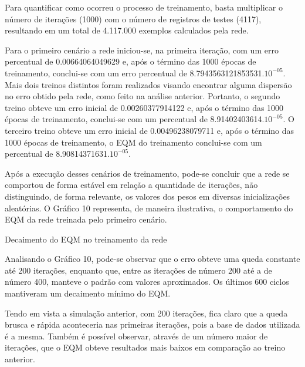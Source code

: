 Para quantificar como ocorreu o processo de treinamento, basta multiplicar o número de iterações (1000) com o número de registros de testes (4117), resultando em um total de 4.117.000 exemplos calculados pela rede.

Para o primeiro cenário a rede iniciou-se, na primeira iteração, com um erro percentual de 0.00664064049629 e, após o término das 1000 épocas de treinamento, conclui-se com um erro percentual de 8.7943563121853531.$10^{-05}$. Mais dois treinos distintos foram realizados visando encontrar alguma dispersão no erro obtido pela rede, como feito na análise anterior. Portanto, o segundo treino obteve um erro inicial de 0.00260377914122 e, após o término das 1000 épocas de treinamento, conclui-se com um percentual de 8.91402403614.$10^{-05}$. O terceiro treino obteve um erro inicial de 0.00496238079711 e, após o término das 1000 épocas de treinamento, o EQM do treinamento conclui-se com um percentual de 8.90814371631.$10^{-05}$.

Após a execução desses cenários de treinamento, pode-se concluir que a rede se comportou de forma estável em relação a quantidade de iterações, não distinguindo, de forma relevante, os valores dos pesos em diversas inicializações aleatórias. O Gráfico 10 representa, de maneira ilustrativa, o comportamento do EQM da rede treinada pelo primeiro cenário.
\begin{grafico}[h]
	\centering
	\caption{Decaimento do EQM no treinamento da rede}
	\label{lingua}
\end{grafico}

Analisando o Gráfico 10, pode-se observar que o erro obteve uma queda constante até 200 iterações, enquanto que, entre as iterações de número 200 até a de número 400, manteve o padrão com valores aproximados. Os últimos 600 ciclos mantiveram um decaimento mínimo do EQM.

Tendo em vista a simulação anterior, com 200 iterações, fica claro que a queda brusca e rápida aconteceria nas primeiras iterações, pois a base de dados utilizada é a mesma. Também é possível observar, através de um número maior de iterações, que o EQM obteve resultados mais baixos em comparação ao treino anterior.

